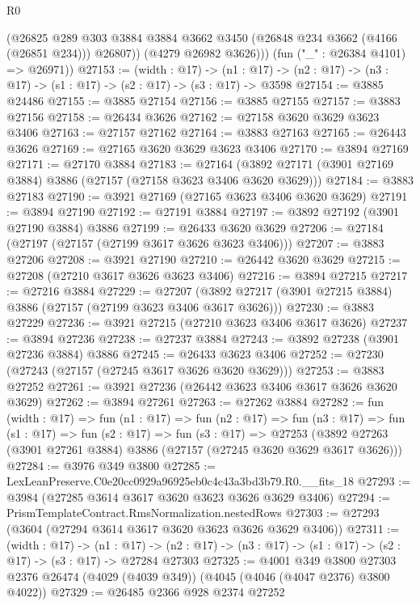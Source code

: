 \begin{lexlean}{R0}
\begin{coremodule}
            (@26825
              @289
              @303
              @3884
              @3884
              @3662
              @3450
              (@26848 @234 @3662 (@4166 (@26851 @234)))
              @26807))
          (@4279 @26982 @3626)))
      (fun ("_" : @26384 @4101) => @26971))
@27153 := (width : @17) ->
  (n1 : @17) -> (n2 : @17) -> (n3 : @17) -> (s1 : @17) -> (s2 : @17) -> (s3 : @17) -> @3598
@27154 := @3885 @24486
@27155 := @3885 @27154
@27156 := @3885 @27155
@27157 := @3883 @27156
@27158 := @26434 @3626
@27162 := @27158 @3620 @3629 @3623 @3406
@27163 := @27157 @27162
@27164 := @3883 @27163
@27165 := @26443 @3626
@27169 := @27165 @3620 @3629 @3623 @3406
@27170 := @3894 @27169
@27171 := @27170 @3884
@27183 := @27164 (@3892 @27171 (@3901 @27169 @3884) @3886 (@27157 (@27158 @3623 @3406 @3620 @3629)))
@27184 := @3883 @27183
@27190 := @3921 @27169 (@27165 @3623 @3406 @3620 @3629)
@27191 := @3894 @27190
@27192 := @27191 @3884
@27197 := @3892 @27192 (@3901 @27190 @3884) @3886
@27199 := @26433 @3620 @3629
@27206 := @27184 (@27197 (@27157 (@27199 @3617 @3626 @3623 @3406)))
@27207 := @3883 @27206
@27208 := @3921 @27190
@27210 := @26442 @3620 @3629
@27215 := @27208 (@27210 @3617 @3626 @3623 @3406)
@27216 := @3894 @27215
@27217 := @27216 @3884
@27229 := @27207 (@3892 @27217 (@3901 @27215 @3884) @3886 (@27157 (@27199 @3623 @3406 @3617 @3626)))
@27230 := @3883 @27229
@27236 := @3921 @27215 (@27210 @3623 @3406 @3617 @3626)
@27237 := @3894 @27236
@27238 := @27237 @3884
@27243 := @3892 @27238 (@3901 @27236 @3884) @3886
@27245 := @26433 @3623 @3406
@27252 := @27230 (@27243 (@27157 (@27245 @3617 @3626 @3620 @3629)))
@27253 := @3883 @27252
@27261 := @3921 @27236 (@26442 @3623 @3406 @3617 @3626 @3620 @3629)
@27262 := @3894 @27261
@27263 := @27262 @3884
@27282 := fun (width : @17) =>
  fun (n1 : @17) =>
  fun (n2 : @17) =>
  fun (n3 : @17) =>
  fun (s1 : @17) =>
  fun (s2 : @17) =>
  fun (s3 : @17) =>
  @27253 (@3892 @27263 (@3901 @27261 @3884) @3886 (@27157 (@27245 @3620 @3629 @3617 @3626)))
@27284 := @3976 @349 @3800
@27285 := LexLeanPreserve.C0e20cc0929a96925eb0c4c43a3bd3b79.R0.__fits_18
@27293 := @3984 (@27285 @3614 @3617 @3620 @3623 @3626 @3629 @3406)
@27294 := PrismTemplateContract.RmsNormalization.nestedRows
@27303 := @27293 (@3604 (@27294 @3614 @3617 @3620 @3623 @3626 @3629 @3406))
@27311 := (width : @17) ->
  (n1 : @17) -> (n2 : @17) -> (n3 : @17) -> (s1 : @17) -> (s2 : @17) -> (s3 : @17) -> @27284 @27303
@27325 := @4001
    @349
    @3800
    @27303
    @2376
    @26474
    (@4029 (@4039 @349))
    (@4045 (@4046 (@4047 @2376) @3800 @4022))
@27329 := @26485 @2366 @928 @2374 @27252

\end{coremodule}
\end{lexlean}
